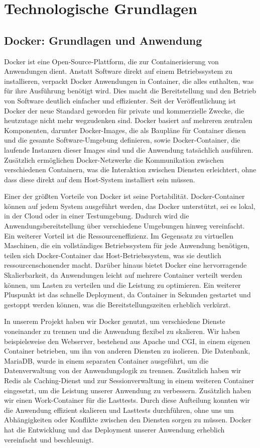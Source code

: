 \section{Technologische Grundlagen}\label{zurhauptdatei}

\subsection{Docker: Grundlagen und Anwendung}\label{präambel}
Docker ist eine Open-Source-Plattform, die zur Containerisierung von Anwendungen dient. Anstatt Software direkt auf einem Betriebssystem zu installieren, verpackt Docker Anwendungen in Container, die alles enthalten, was für ihre Ausführung benötigt wird. Dies macht die Bereitstellung und den Betrieb von Software deutlich einfacher und effizienter. Seit der Veröffentlichung ist Docker der neue Standard geworden für private und kommerzielle Zwecke, die heutzutage nicht mehr wegzudenken sind. Docker basiert auf mehreren zentralen Komponenten, darunter Docker-Images, die als Baupläne für Container dienen und die gesamte Software-Umgebung definieren, sowie Docker-Container, die laufende Instanzen dieser Images sind und die Anwendung tatsächlich ausführen. Zusätzlich ermöglichen Docker-Netzwerke die Kommunikation zwischen verschiedenen Containern, was die Interaktion zwischen Diensten erleichtert, ohne dass diese direkt auf dem Host-System installiert sein müssen.

Einer der größten Vorteile von Docker ist seine Portabilität. Docker-Container können auf jedem System ausgeführt werden, das Docker unterstützt, sei es lokal, in der Cloud oder in einer Testumgebung. Dadurch wird die Anwendungsbereitstellung über verschiedene Umgebungen hinweg vereinfacht. Ein weiterer Vorteil ist die Ressourceneffizienz. Im Gegensatz zu virtuellen Maschinen, die ein vollständiges Betriebssystem für jede Anwendung benötigen, teilen sich Docker-Container das Host-Betriebssystem, was sie deutlich ressourcenschonender macht. Darüber hinaus bietet Docker eine hervorragende Skalierbarkeit, da Anwendungen leicht auf mehrere Container verteilt werden können, um Lasten zu verteilen und die Leistung zu optimieren. Ein weiterer Pluspunkt ist das schnelle Deployment, da Container in Sekunden gestartet und gestoppt werden können, was die Bereitstellungszeiten erheblich verkürzt.

In unserem Projekt haben wir Docker genutzt, um verschiedene Dienste voneinander zu trennen und die Anwendung flexibel zu skalieren. Wir haben beispielsweise den Webserver, bestehend aus Apache und CGI, in einem eigenen Container betrieben, um ihn von anderen Diensten zu isolieren. Die Datenbank, MariaDB, wurde in einem separaten Container ausgeführt, um die Datenverwaltung von der Anwendungslogik zu trennen. Zusätzlich haben wir Redis als Caching-Dienst und zur Sessionverwaltung in einem weiteren Container eingesetzt, um die Leistung unserer Anwendung zu verbessern. Zusätzlich haben wir einen Work-Container für die Lasttests. Durch diese Aufteilung konnten wir die Anwendung effizient skalieren und Lasttests durchführen, ohne uns um Abhängigkeiten oder Konflikte zwischen den Diensten sorgen zu müssen. Docker hat die Entwicklung und das Deployment unserer Anwendung erheblich vereinfacht und beschleunigt.

